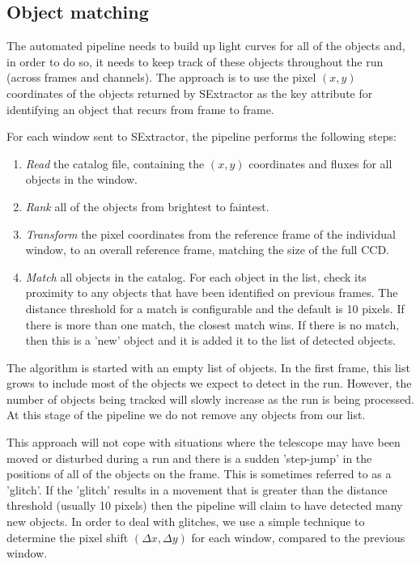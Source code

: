 \subsection{Object matching}
The automated pipeline needs to build up light curves for all of the objects and, in order to do so, it needs to keep track of these objects throughout the run (across frames and channels). The approach is to use the pixel $(x, y)$ coordinates of the objects returned by SExtractor as the key attribute for identifying an object that recurs from frame to frame. 

For each window sent to SExtractor, the pipeline performs the following steps:
\begin{enumerate}
  \item \emph{Read} the catalog file, containing the $(x, y)$ coordinates and fluxes for all objects in the window.
  \item \emph{Rank} all of the objects from brightest to faintest.
  \item \emph{Transform} the pixel coordinates from the reference frame of the individual window, to an overall reference frame, matching the size of the full CCD. 
  \item \emph{Match} all objects in the catalog. For each object in the list, check its proximity to any objects that have been identified on previous frames. The distance threshold for a match is configurable and the default is 10 pixels. If there is more than one match, the closest match wins. If there is no match, then this is a 'new' object and it is added it to the list of detected objects.  
\end{enumerate}

The algorithm is started with an empty list of objects. In the first frame, this list grows to include most of the objects we expect to detect in the run. However, the number of objects being tracked will slowly increase as the run is being processed. At this stage of the pipeline we do not remove any objects from our list. 

This approach will not cope with situations where the telescope may have been moved or disturbed during a run and there is a sudden 'step-jump' in the positions of all of the objects on the frame. This is sometimes referred to as a 'glitch'. If the 'glitch' results in a movement that is greater than the distance threshold (usually 10 pixels) then the pipeline will claim to have detected many new objects. In order to deal with glitches, we use a simple technique to determine the pixel shift $(\Delta x, \Delta y)$ for each window, compared to the previous window. 

